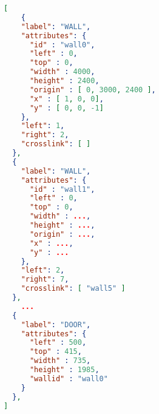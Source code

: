 \documentclass[11pt]{scrartcl}
\begin{document}
\newpage

\begin{lstlisting}[language=json,firstnumber=1,basicstyle=\small]
[
	{
    "label": "WALL",
    "attributes": {
      "id" : "wall0",
      "left" : 0,
      "top" : 0,
      "width" : 4000,
      "height" : 2400,
      "origin" : [ 0, 3000, 2400 ],
      "x" : [ 1, 0, 0],
      "y" : [ 0, 0, -1]
    },
    "left": 1,
    "right": 2,
    "crosslink": [ ]
  },
  {
    "label": "WALL",
    "attributes": {
      "id" : "wall1",
      "left" : 0,
      "top" : 0,
      "width" : ...,
      "height" : ...,
      "origin" : ...,
      "x" : ...,
      "y" : ...
    },
    "left": 2,
    "right": 7,
    "crosslink": [ "wall5" ]
  },
	...	
  {
    "label": "DOOR",
    "attributes": {
      "left" : 500,
      "top" : 415,
      "width" : 735,
      "height" : 1985,
      "wallid" : "wall0"
    }
  },	
]
	
\end{lstlisting}

 
\end{document}
